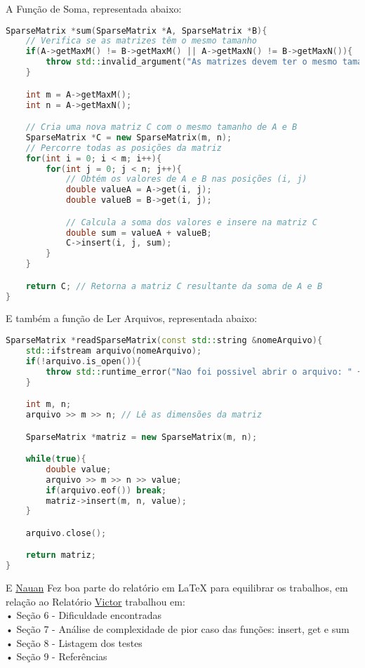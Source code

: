 \documentclass[a4paper,12pt]{article}
\begin{document}
A Função de Soma, representada abaixo:

\begin{lstlisting}[language=C++]
SparseMatrix *sum(SparseMatrix *A, SparseMatrix *B){
    // Verifica se as matrizes têm o mesmo tamanho
    if(A->getMaxM() != B->getMaxM() || A->getMaxN() != B->getMaxN()){
        throw std::invalid_argument("As matrizes devem ter o mesmo tamanho para serem somadas.");
    }

    int m = A->getMaxM();
    int n = A->getMaxN();

    // Cria uma nova matriz C com o mesmo tamanho de A e B
    SparseMatrix *C = new SparseMatrix(m, n);
    // Percorre todas as posições da matriz
    for(int i = 0; i < m; i++){
        for(int j = 0; j < n; j++){
            // Obtém os valores de A e B nas posições (i, j)
            double valueA = A->get(i, j);
            double valueB = B->get(i, j);

            // Calcula a soma dos valores e insere na matriz C
            double sum = valueA + valueB;
            C->insert(i, j, sum);
        }
    }

    return C; // Retorna a matriz C resultante da soma de A e B
}
\end{lstlisting}

E também a função de Ler Arquivos, representada abaixo:

\begin{lstlisting}[language=C++]
SparseMatrix *readSparseMatrix(const std::string &nomeArquivo){
    std::ifstream arquivo(nomeArquivo);
    if(!arquivo.is_open()){
        throw std::runtime_error("Nao foi possivel abrir o arquivo: " + nomeArquivo);
    }

    int m, n;
    arquivo >> m >> n; // Lê as dimensões da matriz

    SparseMatrix *matriz = new SparseMatrix(m, n);

    while(true){
        double value;
        arquivo >> m >> n >> value;
        if(arquivo.eof()) break;
        matriz->insert(m, n, value);
    }

    arquivo.close();

    return matriz;
}
\end{lstlisting}

E \underline{Nauan} Fez boa parte do relatório em LaTeX para equilibrar os trabalhos, em relação ao Relatório \underline{Victor} trabalhou em:
\\• Seção 6 - Dificuldade encontradas
\\• Seção 7 - Análise de complexidade de pior caso das funções: insert, get e sum
\\• Seção 8 - Listagem dos testes
\\• Seção 9 - Referências
\end{document}
